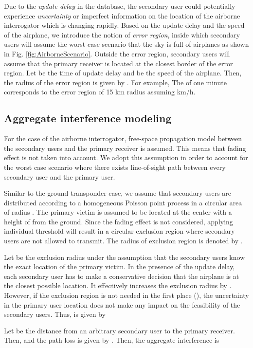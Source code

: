 \documentclass[12pt,submission,journal,onecolumn]{IEEEtran}
\begin{document}
Due to the \emph{update delay} in the database, the secondary user could potentially experience \emph{uncertainty} or imperfect information on the location of the airborne interrogator which is changing rapidly. Based on the update delay and the speed of the airplane, we introduce the notion of \emph{error region}, inside which secondary users will assume the worst case scenario that the sky is full of airplanes as shown in Fig. \ref{fig:AirborneScenario}. Outside the error region, secondary users will assume that the primary receiver is located at the closest border of the error region. Let  be the time of update delay and  be the speed of the airplane. Then, the radius of the error region is given by . For example, The  of one minute corresponds to the error region of 15 km radius assuming  km/h.

\subsection{Aggregate interference modeling}
\label{subsec:AirborneModel}
For the case of the airborne interrogator, free-space propagation model between the secondary users and the primary receiver is assumed. This means that fading effect is not taken into account. We adopt this assumption in order to account for the worst case scenario where there exists line-of-sight path between every secondary user and the primary user.

Similar to the ground transponder case, we assume that  secondary users are distributed according to a homogeneous Poisson point process in a circular area of radius . The primary victim is assumed to be located at the center with a height of  from the ground. Since the fading effect is not considered, applying individual threshold  will result in a circular exclusion region where secondary users are not allowed to transmit. The radius of exclusion region is denoted by .

Let  be the exclusion radius under the assumption that the secondary users know the exact location of the primary victim. In the presence of the update delay, each secondary user has to make a conservative decision that the airplane is at the closest possible location. It effectively increases the exclusion radius by . However, if the exclusion region is not needed in the first place (), the uncertainty in the primary user location does not make any impact on the feasibility of the secondary users. Thus,  is given by


Let  be the distance from an arbitrary secondary user  to the primary receiver. Then,  and the path loss  is given by . Then, the aggregate interference  is
\end{document}
